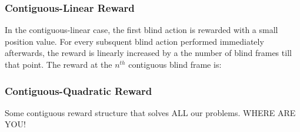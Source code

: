 \subsubsection{Contiguous-Linear Reward}
In the contiguous-linear case, the first blind action is rewarded with a small position value. For every subsquent blind action performed immediately afterwards, the reward is linearly increased by a the number of blind frames till that point. The reward at the $n^{th}$ contiguous blind frame is:


\subsubsection{Contiguous-Quadratic Reward}
Some contiguous reward structure that solves ALL our problems. WHERE ARE YOU!
